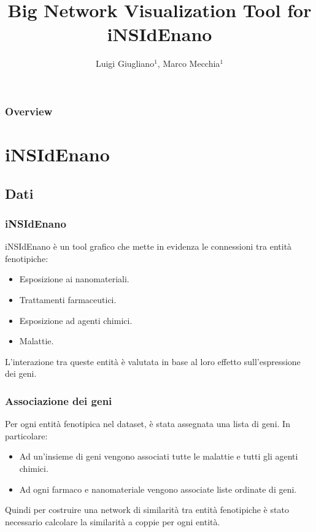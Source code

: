 \documentclass{beamer}
\title{Big Network Visualization Tool for iNSIdEnano}
\author{Luigi Giugliano$^1$, Marco Mecchia$^1$}
\institute{$^1$Universit\'a degli studi di Salerno}
\begin{document}
\begin{frame}
   \maketitle
\end{frame}

\begin{frame}
  \frametitle{Overview}
  \footnotesize \tableofcontents
\end{frame}



\section{iNSIdEnano}
\subsection{Dati}
\begin{frame}
\frametitle{iNSIdEnano}
iNSIdEnano è un tool grafico che mette in evidenza le connessioni tra \alert{entità fenotipiche}:
\begin{itemize}
\item Esposizione ai nanomateriali.
\item Trattamenti farmaceutici.
\item Esposizione ad agenti chimici.
\item Malattie.
\end{itemize}
L'interazione tra queste entità è valutata in base al loro effetto sull'espressione dei geni.
\end{frame}

\begin{frame}
\frametitle{Associazione dei geni}
Per ogni entità fenotipica nel dataset, è stata assegnata una lista di geni. In particolare:
\begin{itemize}
	\item Ad un'insieme di geni vengono associati tutte le malattie e tutti gli agenti chimici.
	\item Ad ogni farmaco e nanomateriale vengono associate liste ordinate di geni.
\end{itemize}
\medskip
Quindi per costruire una network di similarità tra entità fenotipiche è stato necessario calcolare la similarità a coppie per ogni entità.
\end{frame}
\end{document}
